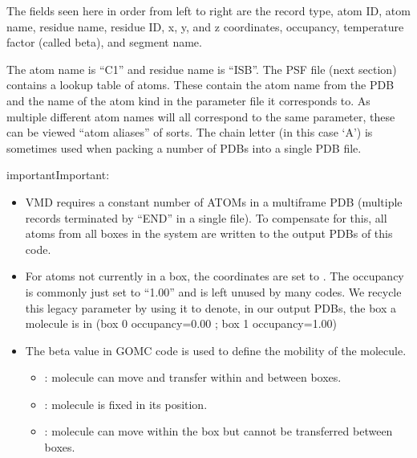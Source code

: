 \documentclass[letterpaper,10pt,english]{sphinxmanual}
\begin{document}
The fields seen here in order from left to right are the record type, atom ID, atom name, residue name, residue ID, x, y, and z coordinates, occupancy, temperature factor (called beta), and segment name.

The atom name is “C1” and residue name is “ISB”. The PSF file (next section) contains a lookup table of atoms. These contain the atom name from the PDB and
the name of the atom kind in the parameter file it corresponds to. As multiple different atom names will all correspond to the same parameter,
these can be viewed “atom aliases” of sorts. The chain letter (in this case ‘A’) is sometimes used when packing a number of PDBs into a single PDB file.

\begin{sphinxadmonition}{important}{Important:}\begin{itemize}
\item {} 
VMD requires a constant number of ATOMs in a multi\sphinxhyphen{}frame PDB (multiple records terminated by “END” in a single file). To compensate for this, all atoms
from all boxes in the system are written to the output PDBs of this code.

\item {} 
For atoms not currently in a box, the coordinates are set to . The occupancy is commonly just set to “1.00” and is left unused by
many codes. We recycle this legacy parameter by using it to denote, in our output PDBs, the box a molecule is in (box 0 occupancy=0.00 ; box 1 occupancy=1.00)

\item {} 
The beta value in GOMC code is used to define the mobility of the molecule.
\begin{itemize}
\item {} 
: molecule can move and transfer within and between boxes.

\item {} 
: molecule is fixed in its position.

\item {} 
: molecule can move within the box but cannot be transferred between boxes.

\end{itemize}

\end{itemize}
\end{sphinxadmonition}
\end{document}
